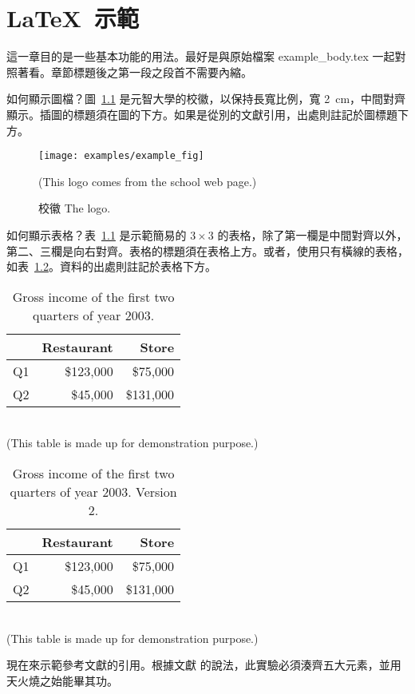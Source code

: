 %
\chapter{\mbox{\LaTeX\ 示範}}
\label{ch:example}
這一章目的是一些基本功能的用法。最好是與原始檔案 example\_body.tex 一起對照著看。章節標題後之第一段之段首不需要內縮。

如何顯示圖檔？圖~\ref{fig:logo} 是元智大學的校徽，以保持長寬比例，寬 2~cm，中間對齊顯示。插圖的標題須在圖的下方。如果是從別的文獻引用，出處則註記於圖標題下方。
\begin{figure}[htbp]
\centering \texttt{[image: examples/example\_fig]}
\caption{\label{fig:logo}校徽 The logo.}
(This logo comes from the school web page.)
\end{figure}

如何顯示表格？表~\ref{tb:income_2003} 是示範簡易的 $3\times3$ 的表格，除了第一欄是中間對齊以外，第二、三欄是向右對齊。表格的標題須在表格上方。或者，使用只有橫線的表格，如表~\ref{tb:income_2003_v2}。資料的出處則註記於表格下方。
%
\begin{table}[htbp]
\caption{\label{tb:income_2003}Gross income of the first two quarters of
year 2003.}
\centering \begin{tabular}{|c|r|r|}
\hline 
&
Restaurant&
Store\tabularnewline
\hline
\hline 
Q1&
\$123,000&
\$75,000\tabularnewline
\hline 
Q2&
\$45,000&
\$131,000\tabularnewline
\hline
\end{tabular}\\
(This table is made up for demonstration purpose.)
\end{table}%
%
\begin{table}[htbp]
\caption{\label{tb:income_2003_v2}Gross income of the first two quarters of
year 2003. Version 2.}
\centering \begin{tabular}{crr}
\hline 
&
Restaurant&
Store\tabularnewline
\hline
Q1&
\$123,000&
\$75,000\tabularnewline
 Q2&
\$45,000&
\$131,000\tabularnewline
\hline
\end{tabular}\\
(This table is made up for demonstration purpose.)
\end{table}


現在來示範參考文獻的引用。根據文獻\cite{ieee_dmr_2_50_2002_chou} 的說法，此實驗必須湊齊五大元素\cite{jap_093_1108_2003_kondakov, ieee_ed_50_1830_2003_oriols, Chem.Mater._8_1365_1996_Papadimitrakopoulos, jap_079_2745_1996_scott, jap_087_8049_2000_adachi, jap_089_1704_2001_brutting, jap_089_4673_2001_popovic, synth.met._132_9_2002_nomura, cjk_book, thinfilm_macleod_2001}，並用天火燒之始能畢其功。


